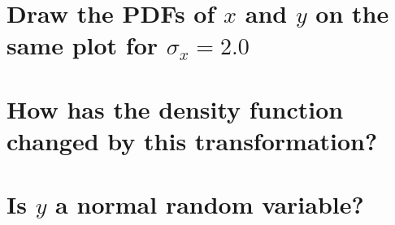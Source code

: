 \documentclass[12pt,letterpaper, onecolumn]{exam}
\begin{document}
\begin{questions}
\begin{parts}
		\part{Draw the PDFs of $x$ and $y$ on the same plot for $\sigma_x = 2.0$}
		\solution{

		}
		\part{How has the density function changed by this transformation?}
		\solution
		\part{Is $y$ a normal random variable?}
		\solution
	\end{parts}
\end{questions}
\end{document}
